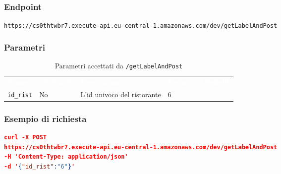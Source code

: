 \subsubsection{Endpoint}
\texttt{https://cs0thtwbr7.execute-api.eu-central-1.amazonaws.com/dev/getLabelAndPost}

\subsubsection{Parametri}
\begin{table}[!htbp]
\renewcommand{\arraystretch}{1.5}

\begin{tabular}[t]{ m{}<{\centering}  m{}<{\centering} m{}<{\centering} m{}<{\centering}  m{}<{\centering} }
	\rowcolor{darkblue}
	\textcolor{white}{\textbf{Nome}} &\textcolor{white}{\textbf{Opzionale}} &\textcolor{white}{\textbf{Descrizione}} &\textcolor{white}{\textbf{Esempio}} &\textcolor{white}{\textbf{Default}} \\ 
\texttt{id\_rist} & No & L'id univoco del ristorante  & 6 &  \\

\end{tabular}
\caption{Parametri accettati da \texttt{/getLabelAndPost}}
\end{table}

\subsubsection{Esempio di richiesta}
\begin{lstlisting}[language=json, caption={Esempio di richiesta \texttt{/getLabelAndPost}}, captionpos=b]
curl -X POST 
https://cs0thtwbr7.execute-api.eu-central-1.amazonaws.com/dev/getLabelAndPost
-H 'Content-Type: application/json'
-d '{"id_rist":"6"}'

\end{lstlisting}

\pagebreak

